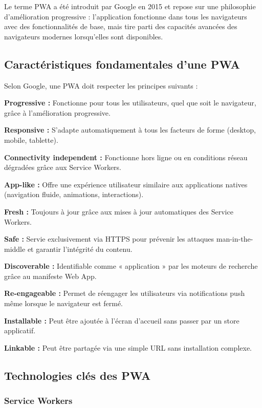 Le terme PWA a été introduit par Google en 2015 et repose sur une philosophie d'amélioration progressive : l'application fonctionne dans tous les navigateurs avec des fonctionnalités de base, mais tire parti des capacités avancées des navigateurs modernes lorsqu'elles sont disponibles.

\subsection{Caractéristiques fondamentales d'une PWA}

Selon Google, une PWA doit respecter les principes suivants :

\textbf{Progressive :} Fonctionne pour tous les utilisateurs, quel que soit le navigateur, grâce à l'amélioration progressive.

\textbf{Responsive :} S'adapte automatiquement à tous les facteurs de forme (desktop, mobile, tablette).


\textbf{Connectivity independent :} Fonctionne hors ligne ou en conditions réseau dégradées grâce aux Service Workers.

\textbf{App-like :} Offre une expérience utilisateur similaire aux applications natives (navigation fluide, animations, interactions).

\textbf{Fresh :} Toujours à jour grâce aux mises à jour automatiques des Service Workers.

\textbf{Safe :} Servie exclusivement via HTTPS pour prévenir les attaques man-in-the-middle et garantir l'intégrité du contenu.

\textbf{Discoverable :} Identifiable comme « application » par les moteurs de recherche grâce au manifeste Web App.

\textbf{Re-engageable :} Permet de réengager les utilisateurs via notifications push même lorsque le navigateur est fermé.

\textbf{Installable :} Peut être ajoutée à l'écran d'accueil sans passer par un store applicatif.

\textbf{Linkable :} Peut être partagée via une simple URL sans installation complexe.

\subsection{Technologies clés des PWA}

\subsubsection{Service Workers}

